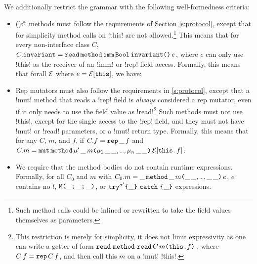 We additionally restrict the grammar with the following well-formedness criteria:
\begin{itemize}
	\item \Q@invariant()@ methods must follow the requirements of Section \ref{s:protocol}, except that for simplicity method calls on \Q!this! are not allowed.\footnote{Such method calls could be inlined or rewritten to take the field values themselves as parameters.} This means that for every non-interface class $C$, $C.\texttt{invariant} = \texttt{read}\,\texttt{method}\,\texttt{imm}\,\texttt{Bool}\,\texttt{invariant}\texttt{(}\texttt{)}\,e$, where $e$ can only use \Q!this! as the receiver of an \Q!imm! or \Q!rep! field access. Formally, this means that forall $\mathcal{E}$ where $e = \mathcal{E}[\texttt{this}]$, we have:
	
	\item Rep mutators must also follow the requirements in \ref{s:protocol}, except that a \Q!mut! method that reads a \Q!rep! field is \emph{always} considered a rep mutator, even if it only needs to use the field value as \Q!read!\footnote{
		This restriction is merely for simplicity, it does not limit expressivity as one can write a getter of form
		$\method{\Kw{read}\,}{\,\Kw{read}\,C}{m}{\Kw{this}\D f}$, where $C.f = \texttt{rep}\,C\,f$, and then call this $m$ on a \Q!mut! \Q!this!.}
		Such methods must not use \Q!this!, except for the single access to the \Q!rep! field, and they must not have \Q!mut! or \Q!read! parameters, or a \Q!mut! return type.
		Formally, this means that for any $C$, $m$, and $f$, if $C.f = \texttt{rep}\,\_\,f$ and $C.m = \method{\Kw{mut}}{\mdf'\,\_}{m}{\drangex{\mdf}{\_\,\_}}{\E[\Kw{this}\D f]}$:

	\item We require that the method bodies do not contain runtime expressions. Formally, for all $C_0$ and $m$ with 
	$C_0.m = \method{\_}{\_}{m}{\rangex{\_\,\_}}{e}$, $e$ contains no $l$, $\texttt{M}\texttt{(}{}\_\texttt{;}\,\_\texttt{;}\,\_\texttt{)}$, or $\texttt{try}^{\sigma'}\texttt{\{}\_\texttt{\}}\ \texttt{catch}\ \texttt{\{}\_\texttt{\}}$ expressions.
	

\end{itemize}
